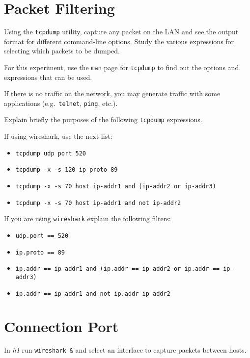 \documentclass{../UTNetLab}
\begin{document}
\section{Packet Filtering}
    Using the \lstinline{tcpdump} utility, capture any packet on the LAN and see the output format
    for different command-line options. Study the various expressions for selecting
    which packets to be dumped.

    For this experiment, use the \lstinline{man} page for \lstinline{tcpdump} to find out the options and
    expressions that can be used.

    If there is no traffic on the network, you may generate traffic with some applications
    (e.g.\ \lstinline{telnet}, \lstinline{ping}, etc.).
    
    \begin{report}
    \item Explain briefly the purposes of the following \lstinline{tcpdump} expressions.
    \end{report}

    If using wireshark, use the next list:
    \begin{itemize}
        \item \lstinline{tcpdump udp port 520}
        \item \lstinline{tcpdump -x -s 120 ip proto 89}
        \item \lstinline[emph={ip-addr1, ip-addr2, ip-addr3}]{tcpdump -x -s 70 host ip-addr1 and (ip-addr2 or ip-addr3)}
        \item \lstinline[emph={ip-addr1, ip-addr2}]{tcpdump -x -s 70 host ip-addr1 and not ip-addr2}
    \end{itemize}
    
    If you are using \lstinline{wireshark} explain the following filters:
    \begin{itemize}
        \item \lstinline[language=generic]{udp.port == 520}
        \item \lstinline[language=generic]{ip.proto == 89}
        \item \lstinline[emph={ip-addr1, ip-addr2, ip-addr3},language={generic}]{ip.addr == ip-addr1 and (ip.addr == ip-addr2 or ip.addr == ip-addr3)}
        \item \lstinline[emph={ip-addr1, ip-addr2},language={generic}]{ip.addr == ip-addr1 and not ip.addr ip-addr2}
    \end{itemize}

\section{Connection Port}
    In \textit{h1} run \lstinline{wireshark &} and select an interface to capture packets between hosts.
\end{document}
